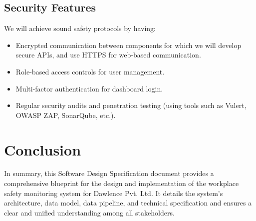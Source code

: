 \documentclass[12pt]{article}
\begin{document}
\subsection{Security Features}
We will achieve sound safety protocols by having:
\begin{itemize}
    \item Encrypted communication between components for which we will develop secure APIs, and use HTTPS for web-based communication.
    \item Role-based access controls for user management.
    \item Multi-factor authentication for dashboard login.
    \item Regular security audits and penetration testing (using tools such as Vulert, OWASP ZAP, SonarQube, etc.).
\end{itemize}

\newpage
\section{Conclusion}
In summary, this Software Design Specification document provides a comprehensive blueprint for the design and implementation of the workplace safety monitoring system for Dawlence Pvt. Ltd. It details  the system's architecture, data model, data pipeline, and technical specification and ensures a clear and unified understanding among all stakeholders.
\end{document}
